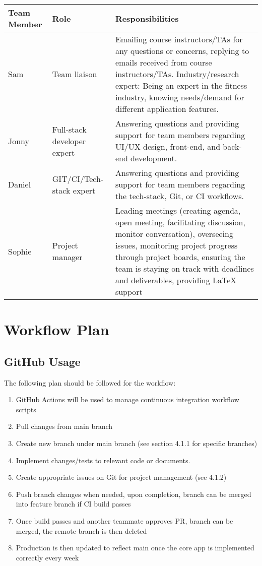 \documentclass{article}
\begin{document}
	\vspace{0.5cm}
	\begin{tabularx}{\textwidth}{|l|l|X|}
		\hline
		\textbf{Team Member} & \textbf{Role} & \textbf{Responsibilities} \\
		\hline
		Sam & Team liaison & Emailing course instructors/TAs for any questions or concerns, replying to emails received from course instructors/TAs. Industry/research expert: Being an expert in the fitness industry, knowing needs/demand for different application features. \\
		\hline
		Jonny & Full-stack developer expert & Answering questions and providing support for team members regarding UI/UX design, front-end, and back-end development. \\
		\hline
		Daniel & GIT/CI/Tech-stack expert & Answering questions and providing support for team members regarding the tech-stack, Git, or CI workflows. \\
		\hline
		Sophie & Project manager & Leading meetings (creating agenda, open meeting, facilitating discussion, monitor conversation), overseeing issues, monitoring project progress through project boards, ensuring the team is staying on track with deadlines and deliverables, providing LaTeX support\\
		\hline
	\end{tabularx}

	\section{Workflow Plan}

	\subsection{GitHub Usage}
	The following plan should be followed for the workflow:
	\begin{enumerate}
		\item GitHub Actions will be used to manage continuous integration workflow scripts
		\item Pull changes from main branch
		\item Create new branch under main branch (see section 4.1.1 for specific branches)
		\item Implement changes/tests to relevant code or documents.
		\item Create appropriate issues on Git for project management (see 4.1.2)
		\item Push branch changes when needed, upon completion, branch can be merged into feature branch if CI build passes
		\item Once build passes and another teammate approves PR, branch can be merged, the remote branch is then deleted
		\item Production is then updated to reflect main once the core app is implemented correctly every week
	\end{enumerate}
\end{document}
